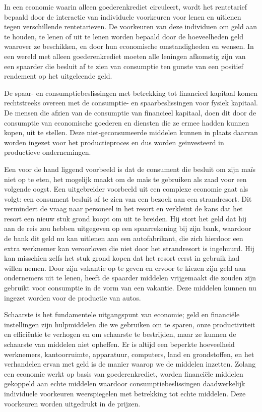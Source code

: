 In een economie waarin alleen goederenkrediet circuleert, wordt het rentetarief bepaald door de interactie van individuele voorkeuren voor lenen en uitlenen tegen verschillende rentetarieven. De voorkeuren van deze individuen om geld aan te houden, te lenen of uit te lenen worden bepaald door de hoeveelheden geld waarover ze beschikken, en door hun economische omstandigheden en wensen. In een wereld met alleen goederenkrediet moeten alle leningen afkomstig zijn van een spaarder die besluit af te zien van consumptie ten gunste van een positief rendement op het uitgeleende geld.

De spaar- en consumptiebeslissingen met betrekking tot financieel kapitaal komen rechtstreeks overeen met de consumptie- en spaarbeslissingen voor fysiek kapitaal. De mensen die afzien van de consumptie van financieel kapitaal, doen dit door de consumptie van economische goederen en diensten die ze ermee hadden kunnen kopen, uit te stellen. Deze niet-geconsumeerde middelen kunnen in plaats daarvan worden ingezet voor het productieproces en dus worden geïnvesteerd in productieve ondernemingen.

Een voor de hand liggend voorbeeld is dat de consument die besluit om zijn maïs niet op te eten, het mogelijk maakt om de maïs te gebruiken als zaad voor een volgende oogst. Een uitgebreider voorbeeld uit een complexe economie gaat als volgt: een consument besluit af te zien van een bezoek aan een strandresort. Dit vermindert de vraag naar personeel in het resort en verkleint de kans dat het resort een nieuw stuk grond koopt om uit te breiden. Hij stort het geld dat hij aan de reis zou hebben uitgegeven op een spaarrekening bij zijn bank, waardoor de bank dit geld nu kan uitlenen aan een autofabrikant, die zich hierdoor een extra werknemer kan veroorloven die niet door het strandresort is ingehuurd. Hij kan misschien zelfs het stuk grond kopen dat het resort eerst in gebruik had willen nemen. Door zijn vakantie op te geven en ervoor te kiezen zijn geld aan ondernemers uit te lenen, heeft de spaarder middelen vrijgemaakt die zouden zijn gebruikt voor consumptie in de vorm van een vakantie. Deze middelen kunnen nu ingezet worden voor de productie van auto\textquotesingle s.

Schaarste is het fundamentele uitgangspunt van economie; geld en financiële instellingen zijn hulpmiddelen die we gebruiken om te sparen, onze productiviteit en efficiëntie te verhogen en om schaarste te bestrijden, maar ze kunnen de schaarste van middelen niet opheffen. Er is altijd een beperkte hoeveelheid werknemers, kantoorruimte, apparatuur, computers, land en grondstoffen, en het verhandelen ervan met geld is de manier waarop we de middelen inzetten. Zolang een economie werkt op basis van goederenkrediet, worden financiële middelen gekoppeld aan echte middelen waardoor consumptiebeslissingen daadwerkelijk individuele voorkeuren weerspiegelen met betrekking tot echte middelen. Deze voorkeuren worden uitgedrukt in de prijzen.

